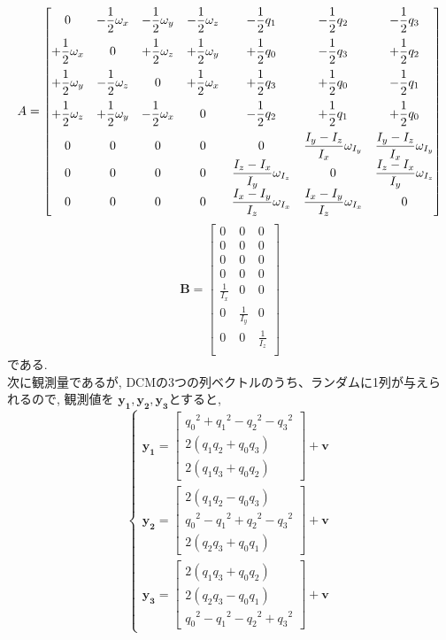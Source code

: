 \documentclass[class=article, crop=false, dvipdfmx, fleqn]{standalone}
\begin{document}
\begin{equation}
 A
  =
  \begin{bmatrix}
    0 & -\displaystyle \frac{1}{2} \omega_{x} & -\displaystyle \frac{1}{2} \omega_{y} & -\displaystyle \frac{1}{2} \omega_{z} &
    -\displaystyle \frac{1}{2} q_{1} & -\displaystyle \frac{1}{2} q_{2} & -\displaystyle \frac{1}{2} q_{3} \\[3mm]
    +\displaystyle \frac{1}{2} \omega_{x} & 0 & +\displaystyle \frac{1}{2} \omega_{z} & +\displaystyle \frac{1}{2} \omega_{y} &
    +\displaystyle \frac{1}{2} q_{0} & -\displaystyle \frac{1}{2} q_{3} & +\displaystyle \frac{1}{2} q_{2} \\[3mm]
    +\displaystyle \frac{1}{2} \omega_{y} & -\displaystyle \frac{1}{2} \omega_{z} & 0 & +\displaystyle \frac{1}{2} \omega_{x} &
    +\displaystyle \frac{1}{2} q_{3} & +\displaystyle \frac{1}{2} q_{0} & -\displaystyle \frac{1}{2} q_{1} \\[3mm]
    +\displaystyle \frac{1}{2} \omega_{z} & +\displaystyle \frac{1}{2} \omega_{y} & -\displaystyle \frac{1}{2} \omega_{x} & 0 &
    -\displaystyle \frac{1}{2} q_{2} & +\displaystyle \frac{1}{2} q_{1} & +\displaystyle \frac{1}{2} q_{0} \\[3mm]
    0 & 0 & 0 & 0 & 0 & \displaystyle \frac{I_{y}-I_{z}}{I_{x}} \omega_{I_{y}} & \displaystyle \frac{I_{y}-I_{z}}{I_{x}} \omega_{I_{y}} \\
    0 & 0 & 0 & 0 & \displaystyle \frac{I_{z}-I_{x}}{I_{y}} \omega_{I_{z}} & 0 & \displaystyle \frac{I_{z}-I_{x}}{I_{y}} \omega_{I_{z}} \\
    0 & 0 & 0 & 0 & \displaystyle \frac{I_{x}-I_{y}}{I_{z}} \omega_{I_{x}} & \displaystyle \frac{I_{x}-I_{y}}{I_{z}} \omega_{I_{x}} & 0
  \end{bmatrix}
\end{equation}
\begin{equation}
  \bm{B} =
  \begin{bmatrix}
    0 & 0 & 0 \\
    0 & 0 & 0 \\
    0 & 0 & 0 \\
    0 & 0 & 0 \\
    \displaystyle \frac{1}{I_x} & 0 & 0 \\
    0 & \displaystyle \frac{1}{I_y} & 0\\
    0 & 0 & \displaystyle \frac{1}{I_z}\\
  \end{bmatrix}
\end{equation}
である. \\
次に観測量であるが, DCMの3つの列ベクトルのうち、ランダムに1列が与えられるので, 観測値を
$\bm{y_1},\bm{y_2},\bm{y_3}$とすると,
\begin{equation}
  \begin{cases}
    \bm{y_1} =
    \begin{bmatrix}
      {q_0}^2 + {q_1}^2 - {q_2}^2 - {q_3}^2 \\
      2(q_1q_2 + q_0q_3) \\
      2(q_1q_3 + q_0q_2)
    \end{bmatrix}
    + \bm{v} \\
    \bm{y_2} =
    \begin{bmatrix}
      2(q_1q_2 - q_0q_3) \\
      {q_0}^2 - {q_1}^2 + {q_2}^2 - {q_3}^2 \\
      2(q_2q_3 + q_0q_1)
    \end{bmatrix}
    + \bm{v} \\
    \bm{y_3} =
    \begin{bmatrix}
      2(q_1q_3 + q_0q_2) \\
      2(q_2q_3 - q_0q_1) \\
      {q_0}^2 - {q_1}^2 - {q_2}^2 + {q_3}^2
    \end{bmatrix}
    + \bm{v}
  \end{cases}
\end{equation}
\end{document}
